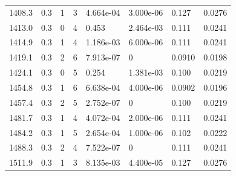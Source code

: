 \documentclass[preview]{standalone}
\begin{document}
{{{\begin{tabular}{L{1.2cm}C{1.2cm} C{0.3cm}C{0.5cm} C{1.4cm}C{1.4cm} C{1.4cm}C{1.4cm}}
  1408.3  &   0.3  & 1     &  3 &  4.664e-04  & 3.000e-06  & 0.127 &  0.0276   \\ 
  1413.0  &   0.3  & 0     &  4 &  0.453  & 2.464e-03  & 0.111 &  0.0241   \\ 
  1414.9  &   0.3  & 1     &  4 &  1.186e-03  & 6.000e-06  & 0.111 &  0.0241   \\ 
  1419.1  &   0.3  & 2     &  6 &  7.913e-07  & 0  & 0.0910 &  0.0198   \\ 
  1424.1  &   0.3  & 0     &  5 &  0.254  & 1.381e-03  & 0.100 &  0.0219   \\ 
  1454.8  &   0.3  & 1     &  6 &  6.638e-04  & 4.000e-06  & 0.0902 &  0.0196   \\ 
  1457.4  &   0.3  & 2     &  5 &  2.752e-07  & 0  & 0.100 &  0.0219   \\ 
  1481.7  &   0.3  & 1     &  4 &  4.072e-04  & 2.000e-06  & 0.111 &  0.0241   \\ 
  1484.2  &   0.3  & 1     &  5 &  2.654e-04  & 1.000e-06  & 0.102 &  0.0222   \\ 
  1488.3  &   0.3  & 2     &  4 &  7.522e-07  & 0  & 0.111 &  0.0241   \\ 
  1511.9  &   0.3  & 1     &  3 &  8.135e-03  & 4.400e-05  & 0.127 &  0.0276   \\ 
\hline 
\end{tabular} 

}}}
\end{document}
